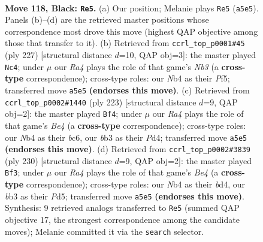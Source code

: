 \documentclass[11pt]{article}
\begin{document}
\clearpage

\begin{figure}[p]\centering
\begin{subfigure}{0.46\textwidth}\centering
\resizebox{\linewidth}{!}{%
\newchessgame
\chessboard[
  setfen={8/8/6k1/r5p1/1n6/1B4K1/8/8 b - - 21 118},
  showmover=false,
  pgfstyle=straightmove, color=movearrow, markmove={a5-e5}
]}
\caption{}
\end{subfigure}\hfill
\begin{subfigure}{0.46\textwidth}\centering
\resizebox{\linewidth}{!}{%
\newchessgame
\chessboard[
  setfen={8/8/1n6/5pk1/5p2/8/2B2K2/8 b - - 39 114},
  showmover=false,
  pgfstyle=straightmove, color=movearrow, markmove={b6-c4}
]}
\caption{}
\end{subfigure}
\\[4pt]
\begin{subfigure}{0.46\textwidth}\centering
\resizebox{\linewidth}{!}{%
\newchessgame
\chessboard[
  setfen={8/8/2B5/4b3/3p2pk/8/4K3/8 b - - 17 112},
  showmover=false,
  pgfstyle=straightmove, color=movearrow, markmove={e5-f4}
]}
\caption{}
\end{subfigure}\hfill
\begin{subfigure}{0.46\textwidth}\centering
\resizebox{\linewidth}{!}{%
\newchessgame
\chessboard[
  setfen={8/4k3/8/3P2PK/3bB3/8/8/8 w - - 91 116},
  showmover=false,
  pgfstyle=straightmove, color=movearrow, markmove={e4-f3}
]}
\caption{}
\end{subfigure}
\caption{\textbf{Move 118, Black: \texttt{Re5}.} (a) Our position; Melanie plays \texttt{Re5} (\texttt{a5e5}). Panels (b)--(d) are the retrieved master positions whose correspondence most drove this move (highest QAP objective among those that transfer to it). (b) Retrieved from \texttt{ccrl\_top\_p0001\#45} (ply 227) [structural distance $d$=10, QAP obj=3]: the master played \texttt{Nc4}; under $\mu$ our \emph{Ra4} plays the role of that game's \emph{Nb3} (a \textbf{cross-type} correspondence); cross-type roles: our \emph{N}b4 as their \emph{P}f5; transferred move \texttt{a5e5} \textbf{(endorses this move)}. (c) Retrieved from \texttt{ccrl\_top\_p0002\#1440} (ply 223) [structural distance $d$=9, QAP obj=2]: the master played \texttt{Bf4}; under $\mu$ our \emph{Ra4} plays the role of that game's \emph{Be4} (a \textbf{cross-type} correspondence); cross-type roles: our \emph{N}b4 as their \emph{b}c6, our \emph{b}b3 as their \emph{P}d4; transferred move \texttt{a5e5} \textbf{(endorses this move)}. (d) Retrieved from \texttt{ccrl\_top\_p0002\#3839} (ply 230) [structural distance $d$=9, QAP obj=2]: the master played \texttt{Bf3}; under $\mu$ our \emph{Ra4} plays the role of that game's \emph{Be4} (a \textbf{cross-type} correspondence); cross-type roles: our \emph{N}b4 as their \emph{b}d4, our \emph{b}b3 as their \emph{P}d5; transferred move \texttt{a5e5} \textbf{(endorses this move)}. Synthesis: 9 retrieved analogs transferred to \texttt{Re5} (summed QAP objective 17, the strongest correspondence among the candidate moves); Melanie committed it via the \texttt{search} selector.}
\label{fig:thought-m235}
\end{figure}
\end{document}
